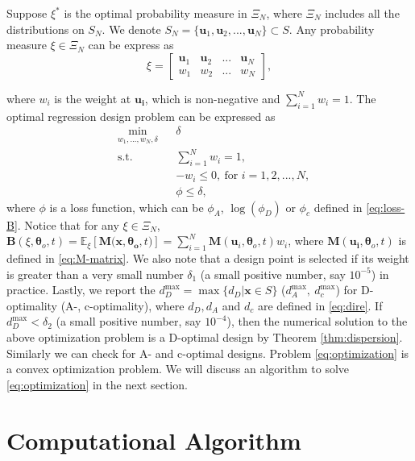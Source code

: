 \documentclass[
]{book}
\theoremstyle{definition}
\theoremstyle{definition}
\theoremstyle{definition}
\theoremstyle{definition}
\theoremstyle{remark}
\begin{document}
Suppose \(\xi^*\) is the optimal probability measure in \(\Xi_N\), where \(\Xi_N\) includes all the distributions on \(S_N\). We denote \(S_N=\{\boldsymbol{u}_1,\boldsymbol{u}_2,...,\boldsymbol{u}_N\}\subset S\). Any probability measure \(\xi \in \Xi_N\) can be express as
\[
    \xi=\begin{bmatrix}
    \boldsymbol{u}_1    &\boldsymbol{u}_2   &...&\boldsymbol{u}_N\\
    w_1     &w_2    &...&w_N
    \end{bmatrix},
\]

where \(w_i\) is the weight at \(\boldsymbol{u_i}\), which is non-negative and \(\sum_{i=1}^Nw_i=1\). The optimal regression design problem can be expressed as
\begin{equation} 
\begin{aligned}
& \underset{w_1, ..., w_N, \delta}{\text{min}}
& &  \delta \\
& \text{s.t.}
& & \sum_{i=1}^N w_i=1,\\
& & & -w_i\leq 0,~ \text{for }i = 1,2, ..., N,\\
& & & \phi \leq \delta, 
\end{aligned}
\label{eq:optimization}
\end{equation}
where \(\phi\) is a loss function, which can be \(\phi_A\), \(\log(\phi_D)\) or \(\phi_c\) defined in \eqref{eq:loss-B}. Notice that for any \(\xi \in \Xi_N\), \(\boldsymbol{B}(\xi,\boldsymbol{\theta}_o,t)=\mathbb{E}_{\xi}[\boldsymbol{M(\boldsymbol{x},\boldsymbol{\theta}_o},t)]=\sum_{i=1}^N \boldsymbol{M}(\boldsymbol{u}_i,\boldsymbol{\theta}_o,t)w_i\), where \(\boldsymbol{M}(\boldsymbol{u_i},\boldsymbol{\theta}_o,t)\) is defined in \eqref{eq:M-matrix}. We also note that a design point is selected if its weight is greater than a very small number \(\delta_1\) (a small positive number, say \(10^{-5}\)) in practice. Lastly, we report the \(d_D^{\max}=\max\{d_D |\boldsymbol{x}\in S\}\) (\(d_A^{\max},~d_c^{\max}\)) for D-optimality (A-, c-optimality), where \(d_D,d_A\) and \(d_c\) are defined in \eqref{eq:dire}. If \(d_D^{\max}<\delta_2\) (a small positive number, say \(10^{-4}\)), then the numerical solution to the above optimization problem is a D-optimal design by Theorem \ref{thm:dispersion}. Similarly we can check for A- and c-optimal designs. Problem \eqref{eq:optimization} is a convex optimization problem. We will discuss an algorithm to solve \eqref{eq:optimization} in the next section.

\section{Computational Algorithm}\label{section-algorithm}
\end{document}

